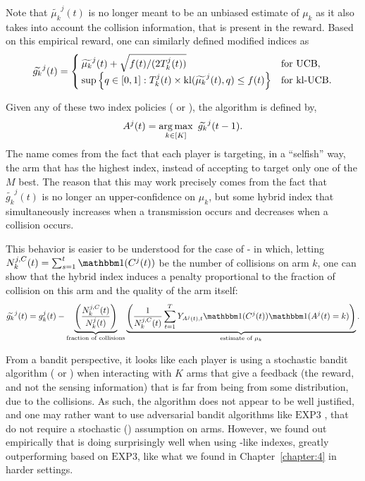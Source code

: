 Note that $\widetilde{\mu_k}^j(t)$ is no longer meant to be an unbiased estimate of $\mu_k$ as it also takes into account the collision information, that is present in the reward. Based on this empirical reward, one can similarly defined modified indices as
%
\begin{equation}\label{eq:5:indexTilde}
  \widetilde{g_k}^j(t) = \begin{cases}
      \widetilde{\mu_k}^j(t)  + \sqrt{  f(t) / (2T_k^j(t))}
      &\text{for } \mathrm{UCB}, \\
      \sup\left\{ q \in [0, 1]: T_k^j(t)\times \mathrm{kl}(\widetilde{\mu_k}^j(t), q) \leq f(t) \right\}
      &\text{for } \mathrm{kl}\text{-}\mathrm{UCB}.
  \end{cases}
\end{equation}

Given any of these two index policies (\UCB{} or \klUCB), the \Selfish{} algorithm is defined by,
%
\begin{equation}
  A^j(t) = \argmax_{ k \in [K]} \ \widetilde{g_k}^j(t-1).\label{algo:5:Selfish}
\end{equation}
The name comes from the fact that each player is targeting, in a ``selfish'' way, the arm that has the highest index, instead of accepting to target only one of the $M$ best.
The reason that this may work precisely comes from the fact that $\widetilde{g_k}^j(t)$ is no longer an upper-confidence on $\mu_k$,
but some hybrid index that simultaneously increases when a transmission occurs and decreases when a collision occurs.

This behavior is easier to be understood for the case of \Selfish-\UCB{} in which, letting $N_k^{j,C}(t) = \sum_{s=1}^t \indic(C^j(t))$ be the number of collisions on arm $k$, one can show that the hybrid \Selfish{} index induces a penalty proportional to the fraction of collision on this arm and the quality of the arm itself:
\begin{equation}
  \widetilde{g_k}^j(t) = g_k^j(t) -
  \underbrace{\left(\frac{N_k^{j,C}(t)}{N_k^j(t)}\right)}_{\text{fraction of collisions}}
  \underbrace{\left(\frac{1}{N_k^{j,C}(t)}\sum_{t=1}^{T}Y_{A^j(t),t} \indic(C^j(t)) \indic(A^j(t) = k)\right)}_{\text{estimate of } \mu_k }.
\end{equation}

From a bandit perspective, it looks like each player is using a stochastic bandit algorithm (\UCB{} or \klUCB) when interacting with $K$ arms that give a feedback (the reward, and not the sensing information) that is far from being \iid{} from some distribution, due to the collisions.
%
As such, the algorithm does not appear to be well justified, and one may rather want to use adversarial bandit algorithms like $\mathrm{EXP3}$ \citep{Auer02NonStochastic}, that do not require a stochastic (\iid) assumption on arms.
%
However, we found out empirically that \Selfish{} is doing surprisingly well when using \UCB-like indexes, greatly outperforming \Selfish{} based on $\mathrm{EXP3}$,
like what we found in Chapter~\ref{chapter:4} in harder settings.

